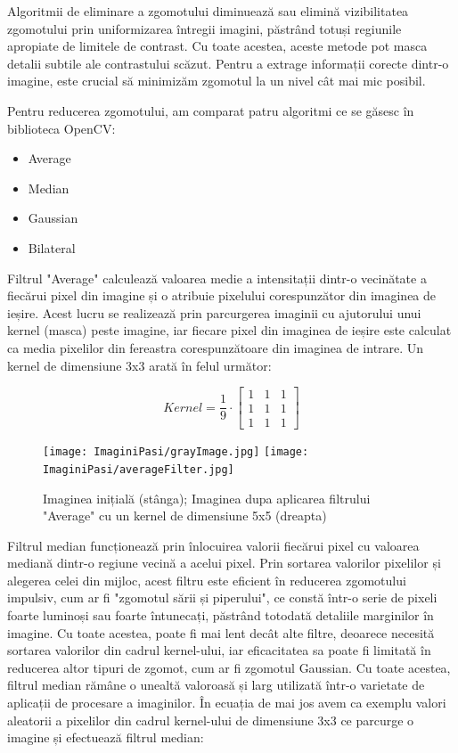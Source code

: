 \documentclass[12pt]{article}
\begin{document}
Algoritmii de eliminare a zgomotului diminueaz\u{a} sau elimin\u{a} vizibilitatea zgomotului prin uniformizarea \^{i}ntregii imagini, p\u{a}str\^{a}nd totuși regiunile apropiate de limitele de contrast. Cu toate acestea, aceste metode pot masca detalii subtile ale contrastului sc\u{a}zut. Pentru a extrage informații corecte dintr-o imagine, este crucial să minimizăm zgomotul la un nivel cât mai mic posibil.

Pentru reducerea zgomotului, am comparat patru algoritmi ce se g\u{a}sesc \^{i}n biblioteca OpenCV:
\begin{itemize}
    \item Average
    \item Median
    \item Gaussian
    \item Bilateral
\end{itemize}

Filtrul "Average" calculeaz\u{a} valoarea medie a intensitații dintr-o vecin\u{a}tate a fiec\u{a}rui pixel din imagine și o atribuie pixelului corespunz\u{a}tor din imaginea de ieșire. Acest lucru se realizeaz\u{a} prin parcurgerea imaginii cu ajutorului unui kernel (masca) peste imagine, iar fiecare pixel din imaginea de ieșire este calculat ca media pixelilor din fereastra corespunz\u{a}toare din imaginea de intrare. Un kernel de dimensiune 3x3 arat\u{a} \^{i}n felul urm\u{a}tor:

\begin{equation}
    Kernel=\frac{1}{9} \cdot \begin{bmatrix}
        1 & 1 & 1 \\
        1 & 1 & 1 \\
        1 & 1 & 1 
    \end{bmatrix}
\end{equation}

\begin{figure}[H]
  \centering
  \texttt{[image: ImaginiPasi/grayImage.jpg]}\hfill
  \texttt{[image: ImaginiPasi/averageFilter.jpg]}
  \caption{Imaginea inițial\u{a} (st\^{a}nga); Imaginea dupa aplicarea filtrului "Average" cu un kernel de dimensiune 5x5 (dreapta)}
  \label{fig:filtrul_average}
\end{figure}

Filtrul median funcționeaz\u{a} prin \^{i}nlocuirea valorii fiec\u{a}rui pixel cu valoarea median\u{a} dintr-o regiune vecin\u{a} a acelui pixel. Prin sortarea valorilor pixelilor și alegerea celei din mijloc, acest filtru este eficient \^{i}n reducerea zgomotului impulsiv, cum ar fi "zgomotul s\u{a}rii și piperului", ce const\u{a} \^{i}ntr-o serie de pixeli foarte luminoși sau foarte \^{i}ntunecați, p\u{a}str\^{a}nd totodat\u{a} detaliile marginilor în imagine. Cu toate acestea, poate fi mai lent decât alte filtre, deoarece necesit\u{a} sortarea valorilor din cadrul kernel-ului, iar eficacitatea sa poate fi limitat\u{a} \^{i}n reducerea altor tipuri de zgomot, cum ar fi zgomotul Gaussian. Cu toate acestea, filtrul median r\u{a}m\^{a}ne o unealt\u{a} valoroas\u{a} și larg utilizat\u{a} \^{i}ntr-o varietate de aplicații de procesare a imaginilor. \^{I}n ecuația de mai jos avem ca exemplu valori aleatorii a pixelilor din cadrul kernel-ului de dimensiune 3x3 ce parcurge o imagine și efectueaz\u{a} filtrul median: 
\end{document}
